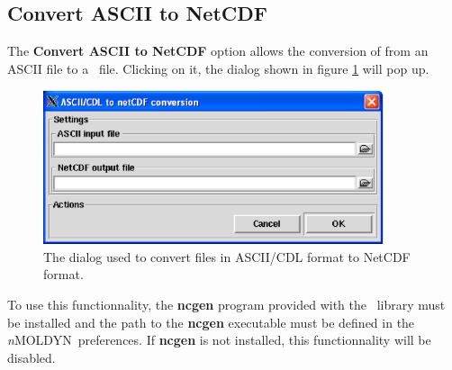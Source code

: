 \documentclass[a4paper,11pt]{report}
\newcommand{\NMOLDYN}{\textit{n}MOLDYN}
\begin{document}
\subsection{Convert ASCII to NetCDF}
\label{convert_ascii_netcdf}
The \textbf{Convert ASCII to NetCDF} option allows the conversion of from an ASCII file to a \NetCDF\ file. 
Clicking on it, the dialog shown in figure \ref{fig:convert_ascii_netcdf} will pop up. 
\newpage
\begin{figure}[h!]
\label{fig:convert_ascii_netcdf}
\begin{center}
\includegraphics[width=10cm]{Figures/convert_ascii_netcdf.eps}
\end{center}
\caption[The ASCII to NetCDF conversion dialog]{The dialog used to convert files in ASCII/CDL format to NetCDF format.}
\end{figure}   

To use this functionnality, the \textbf{ncgen} program \cite{ncgen} provided with the \NetCDF\ library must be 
installed and the path to the \textbf{ncgen} executable must be defined in the \NMOLDYN\ preferences. 
If \textbf{ncgen} is not installed, this functionnality will be disabled.
\end{document}
